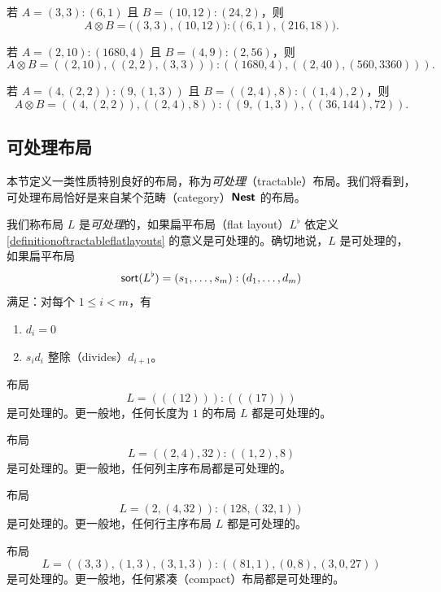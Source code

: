 \begin{example} 若 $A = (3,3):(6,1)$ 且 $B = (10,12):(24,2)$，则
    \[ 
    A \otimes B = \bigl((3,3),(10,12) \bigr) : \bigl((6,1),(216,18) \bigr).
    \]
\end{example}

\begin{example}
    若 $A = (2,10):(1680,4) $ 且 $B = (4,9):(2,56)$，则
    \[
    A \otimes B = ( (2,10) , ((2,2),(3,3) ) ) : ((1680,4), ( ( 2 ,40 ) , (560,3360 )  ) ).
    \]
\end{example}

\begin{example}
    若 $A = (4,(2,2)):(9,(1,3))$ 且 $B = ((2,4),8):((1,4),2)$，则
    \[
    A \otimes B = ( ( 4,(2,2)),((2,4),8 ) ) : ( ( 9,(1,3)),((36,144),72 ) ).
    \]
\end{example}

\subsection{可处理布局}

本节定义一类性质特别良好的布局，称为{\it 可处理}（tractable）布局。我们将看到，可处理布局恰好是来自某个范畴（category）${\boldsymbol{\mathsf{Nest}}}$ 的布局。

\begin{definition}\label{definitionoftractablelayouts}
    我们称布局 $L$ 是{\it 可处理}的，如果扁平布局（flat layout）$L^\flat$ 依定义 \ref{definitionoftractableflatlayouts} 的意义是可处理的。确切地说，$L$ 是可处理的，如果扁平布局
    \[
    \mathsf{sort}(L^\flat) = (s_1,\dots,s_m):(d_1,\dots,d_m)
    \]
    满足：对每个 $1 \leq i < m$，有
    \begin{enumerate}
        \item $d_i = 0$
        \item $s_id_i$ 整除（divides）$d_{i+1}$。
    \end{enumerate}
\end{definition}

\begin{example}
    布局
    \[L = (((12))):(((17)))\]
    是可处理的。更一般地，任何长度为 $1$ 的布局 $L$ 都是可处理的。
\end{example}

\begin{example}
    布局
    \[L = ((2,4),32):((1,2),8)\]
    是可处理的。更一般地，任何列主序布局都是可处理的。
\end{example}
\begin{example}
    布局
    \[L = (2,(4,32)):(128,(32,1))\]
    是可处理的。更一般地，任何行主序布局 $L$ 都是可处理的。
\end{example}
\begin{example}
    布局
    \[L = ((3,3),(1,3),(3,1,3)):((81,1),(0,8),(3,0,27))\]
    是可处理的。更一般地，任何紧凑（compact）布局都是可处理的。
\end{example}

